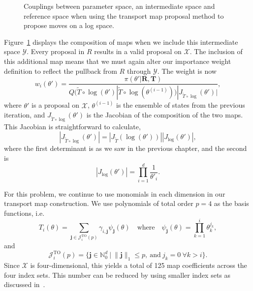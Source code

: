 \documentclass[final]{siamltex}
\newcommand\irregularcircle[2]{%
  \pgfextra {\pgfmathsetmacro\len{(#1)+rand*(#2)}}
  +(0:\len pt)
  \foreach \a in {10,20,...,350}{
    \pgfextra {\pgfmathsetmacro\len{(#1)+rand*(#2)}}
    -- +(\a:\len pt)
  } -- cycle
}
\begin{document}
\begin{figure}
	\centering
	\caption{Couplings between parameter space, an intermediate space and reference space when using the transport map proposal method to propose moves on a log space.}
	\label{fig:chem_log_coupling}
\end{figure}

Figure~\ref{fig:chem_log_coupling} displays the composition of maps when we include this intermediate space $\mathcal{Y}$. Every proposal in $R$ results in a valid proposal on $\mathcal{X}$. The inclusion of this additional map means that we must again alter our importance weight definition to reflect the pullback from $R$ through $\mathcal{Y}$. The weight is now
\[
	w_i(\theta') = \frac{\pi(\theta'|\mathbf{R},\mathbf{T})}{Q(\tilde{T}\circ\log(\theta')|\tilde{T}\circ\log(\theta^{(i-1)}))|J_{\tilde{T}\circ\log}(\theta')|},
\]
where $\theta'$ is a proposal on $\mathcal{X}$, $\theta^{(i-1)}$ is the ensemble of states from the previous iteration, and $J_{\tilde{T}\circ\log}(\theta')$ is the Jacobian of the composition of the two maps. This Jacobian is straightforward to calculate,
\[
	|J_{\tilde{T}\circ\log}(\theta')| = |J_{\tilde{T}}(\log(\theta'))||J_{\log}(\theta')|,
\]
where the first determinant is as we saw in the previous chapter, and the second is
\[
	|J_{\log}(\theta')| = \prod\limits_{i=1}^d \frac{1}{\theta'_i}.
\]

For this problem, we continue to use monomials in each dimension in our transport map construction. We use polynomials of total order $p=4$ as the basis functions, i.e.
\[
	T_i(\theta) = \sum_{\mathbf{j}\in\mathcal{J}^{\text{TO}}_i(p)} \gamma_{i,\mathbf{j}}\psi_{\mathbf{j}}(\theta) \quad \text{where} \quad \psi_\mathbf{j}(\theta) = \prod\limits_{k=1}^i \theta_k^{j_k},
\]
and
\[
	\mathcal{J}^{\text{TO}}_i(p) = \{\mathbf{j} \in \mathbb{N}^d_0\ |\ \|\mathbf{j}\|_1 \leq p, \ \text{and}\ j_k = 0\ \forall k > i\}.
\]
Since $\mathcal{X}$ is four-dimensional, this yields a total of 125 map coefficients across the four index sets. This number can be reduced by using smaller index sets as discussed in~\cite{parno2014transport}.
\end{document}
